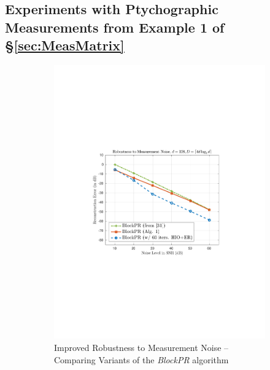 \subsection{Experiments with Ptychographic Measurements from Example 1 of \S \ref{sec:MeasMatrix}}
\label{sec:PtychographicMeasExper}

%
\begin{figure}[hbtp]
\centering
\begin{subfigure}[b]{0.8\textwidth}
\centering
\includegraphics[clip=true, trim = 1.5in 3.35in 1.6in 3.25in,scale=0.8]{pics/fig6a}
\caption{Improved Robustness to Measurement Noise -- Comparing Variants of the {\em BlockPR}
algorithm}
\label{fig:global_vs_local_ptych}
\end{subfigure}
\hfill
\begin{subfigure}[b]{0.8\textwidth}
\centering

\end{subfigure}
\end{figure}
